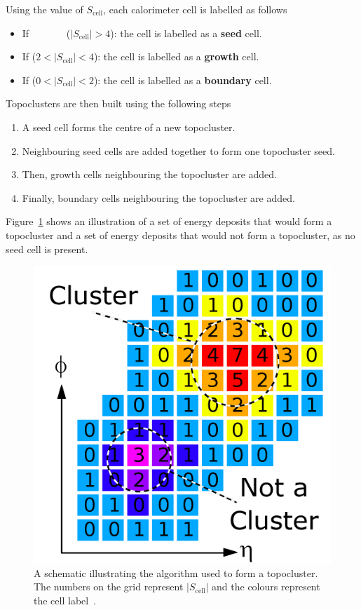 \noindent
Using the value of $S_{\text{cell}}$, each calorimeter cell is labelled as follows
\vspace{-1em}
\begin{itemize}
\item If \ \ \ \ \ \ \ ($|S_{\text{cell}}| > 4$): the cell is labelled as a \textbf{seed} cell.
\item If ($2 < |S_{\text{cell}}| < 4$): the cell is labelled as a \textbf{growth} cell.
\item If ($0 < |S_{\text{cell}}| < 2$): the cell is labelled as a \textbf{boundary} cell.
\end{itemize}
Topoclusters are then built using the following steps
\vspace{-1em}
\begin{enumerate}
\item A seed cell forms the centre of a new topocluster.
\item Neighbouring seed cells are added together to form one topocluster seed.
\item Then, growth cells neighbouring the topocluster are added.
\item Finally, boundary cells neighbouring the topocluster are added.
\end{enumerate}
Figure~\ref{fig:obj-topo_schem} shows an illustration of a set of energy deposits that would form a topocluster
and a set of energy deposits that would not form a topocluster, as no seed cell is present.
\begin{figure}[!ht]
  \begin{center}
    \includegraphics[width=0.36\linewidth, angle=0]{figs/Objects/topo_schem.png}
  \end{center}
  \caption[A schematic illustrating the algorithm used to form a topocluster.]
          {A schematic illustrating the algorithm used to form a topocluster. The numbers on the grid represent $|S_{\text{cell}}|$ and the colours represent the cell label~\cite{det-magnet_fig}.}
  \label{fig:obj-topo_schem}
\vspace{-0.5em}
\end{figure}

